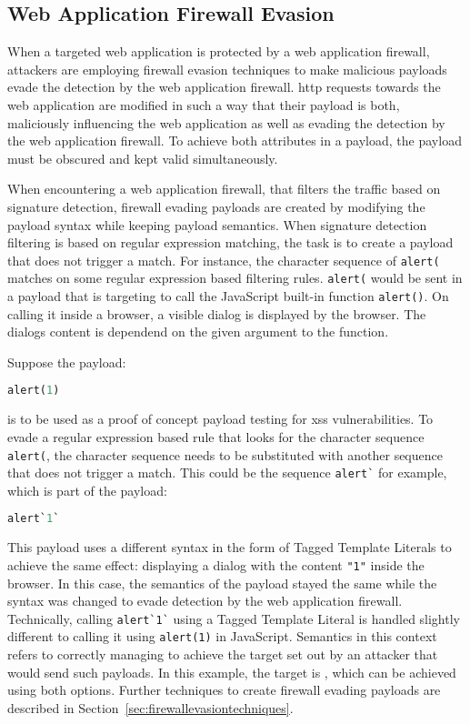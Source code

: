 \subsection{Web Application Firewall Evasion}
When a targeted web application is protected by a web application firewall, attackers are employing firewall evasion techniques to make malicious payloads evade the detection by the web application firewall.
\acrshort{http} requests towards the web application are modified in such a way that their payload is both, maliciously influencing the web application as well as evading the detection by the web application firewall. To achieve both attributes in a payload, the payload must be obscured and kept valid simultaneously. 

When encountering a web application firewall, that filters the traffic based on signature detection, firewall evading payloads are created by modifying the payload syntax while keeping payload semantics.
When signature detection filtering is based on regular expression matching, the task is to create a payload that does not trigger a match.
For instance, the character sequence of \verb|alert(| matches on some regular expression based filtering rules. \verb|alert(| would be sent in a payload that is targeting to call the JavaScript built-in function \verb|alert()|. On calling it inside a browser, a visible dialog is displayed by the browser. The dialogs content is dependend on the given argument to the function. \cite{js/alert}

Suppose the payload: 

\begin{lstlisting}[style=basicStyle, language=Python]
alert(1)
\end{lstlisting}
is to be used as a proof of concept payload testing for \acrshort{xss} vulnerabilities.
To evade a regular expression based rule that looks for the character sequence \verb|alert(|, the character sequence needs to be substituted with another sequence that does not trigger a match. 
This could be the sequence \verb|alert`| for example, which is part of the payload:

\begin{lstlisting}[style=basicStyle, language=Python]
alert`1`
\end{lstlisting}
This payload uses a different syntax in the form of Tagged Template Literals to achieve the same effect: displaying a dialog with the content \verb|"1"| inside the browser.
In this case, the semantics of the payload stayed the same while the syntax was changed to evade detection by the web application firewall. 
Technically, calling \verb|alert`1`| using a Tagged Template Literal is handled slightly different to calling it using \verb|alert(1)| in JavaScript. Semantics in this context refers to correctly managing to achieve the target set out by an attacker that would send such payloads. In this example, the target is , which can be achieved using both options.
Further techniques to create firewall evading payloads are described in Section~\ref{sec:firewallevasiontechniques}.

